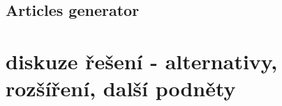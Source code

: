 \subsection{Articles generator}


\section{diskuze řešení - alternativy, rozšíření, další podněty}






















